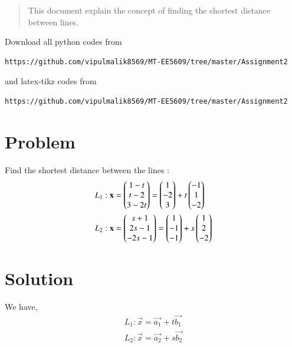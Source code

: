 \documentclass[journal,12pt,twocolumn]{IEEEtran}
\begin{document}
\date{\today}

\maketitle
\newpage
\bigskip
\renewcommand{\thefigure}{\theenumi}
\renewcommand{\thetable}{\theenumi}

\begin{abstract}
This document explain the concept of finding the shortest distance between lines.
\end{abstract}
Download all python codes from 
\begin{lstlisting}
https://github.com/vipulmalik8569/MT-EE5609/tree/master/Assignment2
\end{lstlisting}
and latex-tikz codes from 
\begin{lstlisting}
https://github.com/vipulmalik8569/MT-EE5609/tree/master/Assignment2
\end{lstlisting}

\section{\textbf{Problem}}

Find the shortest distance between the lines :
\begin{align}
L_1 :\mathbf{x} &= \begin{pmatrix} 1-t \\ t-2 \\ 3-2t \end{pmatrix} = \begin{pmatrix}1\\-2\\3\end{pmatrix}+ t\begin{pmatrix}-1\\1\\-2\end{pmatrix}\\
L_2 :\mathbf{x} &= \begin{pmatrix} s+1 \\ 2s-1 \\ -2s-1 \end{pmatrix} = \begin{pmatrix}1\\-1\\-1\end{pmatrix}+ s\begin{pmatrix}1\\2\\-2\end{pmatrix} 
\end{align}

\section{\textbf{Solution}}
We have,
\begin{align}
    L_1 : \vec{x}= \vec{a_1} + t \vec{b_1}\\
    L_2 : \vec{x}= \vec{a_2} + s \vec{b_2}
\end{align}
\end{document}
